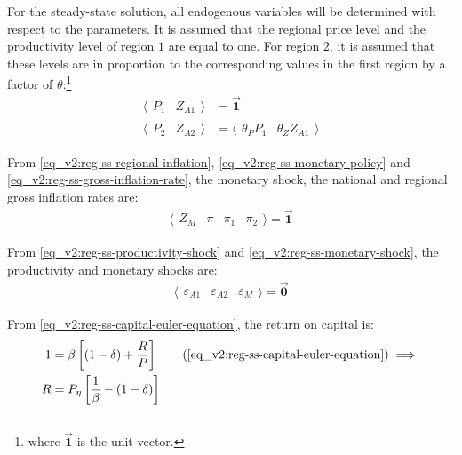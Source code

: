 \documentclass[../thesis.tex]{subfiles}
\begin{document}
	For the steady-state solution, all endogenous variables will be determined with respect to the parameters. It is assumed that the regional price level and the productivity level of region $1$ are equal to one. For region $2$, it is assumed that these levels are in proportion to the corresponding values in the first region by a factor of $\theta$:\footnote{where $\vec{\bm{1}}$ is the unit vector.}
	\begin{align}
		\langle \begin{matrix} P_{1} & Z_{A1} \end{matrix} \rangle &= \vec{\bm{1}} \label{eq_v2:reg-ss-p1-za1} 
		\\ 
		\langle \begin{matrix} P_{2} & Z_{A2} \end{matrix} \rangle &= \langle \begin{matrix} \theta_{P} P_{1} & \theta_{Z} Z_{A1} \end{matrix} \rangle \label{eq_v2:reg-ss-p2-za2}
	\end{align}
	
	From \ref{eq_v2:reg-ss-regional-inflation}, \ref{eq_v2:reg-ss-monetary-policy} and \ref{eq_v2:reg-ss-gross-inflation-rate}, the monetary shock, the national and regional gross inflation rates are:
	\begin{align}
		\langle \begin{matrix} Z_{M} & \pi & \pi_{1} & \pi_{2} \end{matrix} \rangle  = \vec{\bm{1}} \label{eq_v2:reg-ss-zm-pi}
	\end{align}
	
	From \ref{eq_v2:reg-ss-productivity-shock} and \ref{eq_v2:reg-ss-monetary-shock}, the productivity and monetary shocks are:
	\begin{align}
		\langle \begin{matrix} \varepsilon_{A1} & \varepsilon_{A2} & \varepsilon_{M} \end{matrix} \rangle = \vec{\bm{0}} \label{eq_v2:reg-ss-epsilon}
	\end{align}

	
	From \ref{eq_v2:reg-ss-capital-euler-equation}, the return on capital is:
	\begin{align}
		1 &= \beta \left[ (1 - \delta) + \frac{R}{P} \right] \tag{\ref{eq_v2:reg-ss-capital-euler-equation}} \implies \\
		R &= P_{\eta} \left[ \frac{1}{\beta} - (1- \delta) \right] \label{eq_v2:reg-ss-return-on-capital}
	\end{align}
\end{document}
